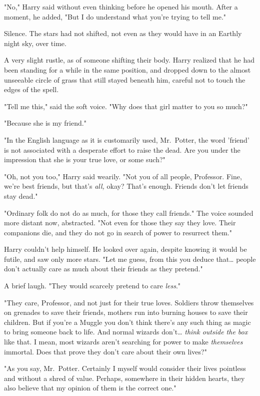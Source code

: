 "No," Harry said without even thinking before he opened his mouth. After a moment, he added, "But I do understand what you're trying to tell me."

Silence. The stars had not shifted, not even as they would have in an Earthly night sky, over time.

A very slight rustle, as of someone shifting their body. Harry realized that he had been standing for a while in the same position, and dropped down to the almost unseeable circle of grass that still stayed beneath him, careful not to touch the edges of the spell.

"Tell me this," said the soft voice. "Why does that girl matter to you so much?"

"Because she is my friend."

"In the English language as it is customarily used, Mr.~Potter, the word 'friend' is not associated with a desperate effort to raise the dead. Are you under the impression that she is your true love, or some such?"

"Oh, not you too," Harry said wearily. "Not you of all people, Professor. Fine, we're best friends, but that's \emph{all,} okay? That's enough. Friends don't let friends stay dead."

"Ordinary folk do not do as much, for those they call friends." The voice sounded more distant now, abstracted. "Not even for those they say they love. Their companions die, and they do not go in search of power to resurrect them."

Harry couldn't help himself. He looked over again, despite knowing it would be futile, and saw only more stars. "Let me guess, from this you deduce that{\ldots} people don't actually care as much about their friends as they pretend."

A brief laugh. "They would scarcely pretend to care \emph{less}."

"They care, Professor, and not just for their true loves. Soldiers throw themselves on grenades to save their friends, mothers run into burning houses to save their children. But if you're a Muggle you don't think there's any such thing as magic to bring someone back to life. And normal wizards don't{\ldots} \emph{think outside the box} like that. I mean, most wizards aren't searching for power to make \emph{themselves} immortal. Does that prove they don't care about their own lives?"

"As you say, Mr.~Potter. Certainly I myself would consider their lives pointless and without a shred of value. Perhaps, somewhere in their hidden hearts, they also believe that my opinion of them is the correct one."

